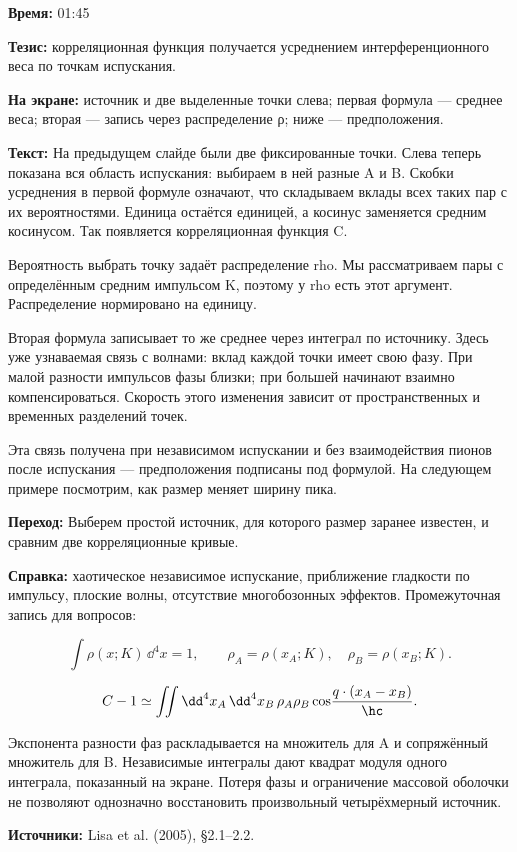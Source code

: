 \textbf{Время:} 01:45

\textbf{Тезис:} корреляционная функция получается усреднением интерференционного веса по точкам испускания.

\textbf{На экране:} источник и две выделенные точки слева; первая формула — среднее веса; вторая — запись через распределение ρ; ниже — предположения.

\textbf{Текст:} На предыдущем слайде были две фиксированные точки. Слева теперь показана вся область испускания: выбираем в ней разные A и B. Скобки усреднения в первой формуле означают, что складываем вклады всех таких пар с их вероятностями. Единица остаётся единицей, а косинус заменяется средним косинусом. Так появляется корреляционная функция C.

Вероятность выбрать точку задаёт распределение rho. Мы рассматриваем пары с определённым средним импульсом K, поэтому у rho есть этот аргумент. Распределение нормировано на единицу.

Вторая формула записывает то же среднее через интеграл по источнику. Здесь уже узнаваемая связь с волнами: вклад каждой точки имеет свою фазу. При малой разности импульсов фазы близки; при большей начинают взаимно компенсироваться. Скорость этого изменения зависит от пространственных и временных разделений точек.

Эта связь получена при независимом испускании и без взаимодействия пионов после испускания — предположения подписаны под формулой. На следующем примере посмотрим, как размер меняет ширину пика.

\textbf{Переход:} Выберем простой источник, для которого размер заранее известен, и сравним две корреляционные кривые.

\textbf{Справка:} хаотическое независимое испускание, приближение гладкости по импульсу, плоские волны, отсутствие многобозонных эффектов. Промежуточная запись для вопросов:

\[\int\rho(x;K)\,\dd^4x=1,\qquad\rho_A=\rho(x_A;K),\quad\rho_B=\rho(x_B;K).\]

\[C-1\simeq\iint\dd^4x_A\,\dd^4x_B\,\rho_A\rho_B\cos\!\frac{q\cdot(x_A-x_B)}{\hc}.\]

Экспонента разности фаз раскладывается на множитель для A и сопряжённый множитель для B. Независимые интегралы дают квадрат модуля одного интеграла, показанный на экране. Потеря фазы и ограничение массовой оболочки не позволяют однозначно восстановить произвольный четырёхмерный источник.

\textbf{Источники:} Lisa et al. (2005), §2.1–2.2.
